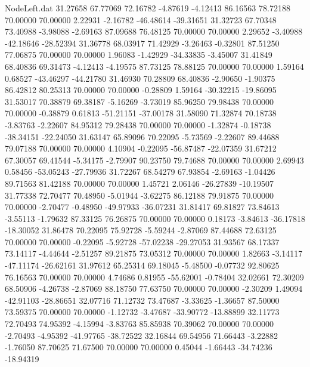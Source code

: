 \begin{filecontents}{NodeLeft.dat}
  31.27658   67.77069   72.16782    -4.87619   -4.12413   86.16563   78.72188   70.00000   70.00000    2.22931   -2.16782  -46.48614  -39.31651
  31.32723   67.70348   73.40988    -3.98088   -2.69163   87.09688   76.48125   70.00000   70.00000    2.29652   -3.40988  -42.18646  -28.52394
  31.36778   68.03917   71.42929    -3.26463   -0.32801   87.51250   77.06875   70.00000   70.00000    1.96083   -1.42929  -34.33835   -3.45007
  31.41849   68.40836   69.31473    -4.12413   -4.19575   87.73125   78.88125   70.00000   70.00000    1.59164    0.68527  -43.46297  -44.21780
  31.46930   70.28809   68.40836    -2.90650   -1.90375   86.42812   80.25313   70.00000   70.00000   -0.28809    1.59164  -30.32215  -19.86095
  31.53017   70.38879   69.38187    -5.16269   -3.73019   85.96250   79.98438   70.00000   70.00000   -0.38879    0.61813  -51.21151  -37.00178
  31.58090   71.32874   70.18738    -3.83763   -2.22607   84.95312   79.28438   70.00000   70.00000   -1.32874   -0.18738  -38.34151  -22.24050
  31.63147   65.89096   70.22095    -5.73569   -2.22607   89.44688   79.07188   70.00000   70.00000    4.10904   -0.22095  -56.87487  -22.07359
  31.67212   67.30057   69.41544    -5.34175   -2.79907   90.23750   79.74688   70.00000   70.00000    2.69943    0.58456  -53.05243  -27.79936
  31.72267   68.54279   67.93854    -2.69163   -1.04426   89.71563   81.42188   70.00000   70.00000    1.45721    2.06146  -26.27839  -10.19507
  31.77338   72.70477   70.48950    -5.01944   -3.62275   86.12188   79.91875   70.00000   70.00000   -2.70477   -0.48950  -49.97933  -36.07231
  31.81417   69.81827   73.84613    -3.55113   -1.79632   87.33125   76.26875   70.00000   70.00000    0.18173   -3.84613  -36.17818  -18.30052
  31.86478   70.22095   75.92728    -5.59244   -2.87069   87.44688   72.63125   70.00000   70.00000   -0.22095   -5.92728  -57.02238  -29.27053
  31.93567   68.17337   73.14117    -4.44644   -2.51257   89.21875   73.05312   70.00000   70.00000    1.82663   -3.14117  -47.11174  -26.62161
  31.97612   65.25314   69.18045    -5.48500   -0.07732   92.80625   76.16563   70.00000   70.00000    4.74686    0.81955  -55.62001   -0.78404
  32.02661   72.30209   68.50906    -4.26738   -2.87069   88.18750   77.63750   70.00000   70.00000   -2.30209    1.49094  -42.91103  -28.86651
  32.07716   71.12732   73.47687    -3.33625   -1.36657   87.50000   73.59375   70.00000   70.00000   -1.12732   -3.47687  -33.90772  -13.88899
  32.11773   72.70493   74.95392    -4.15994   -3.83763   85.85938   70.39062   70.00000   70.00000   -2.70493   -4.95392  -41.97765  -38.72522
  32.16844   69.54956   71.66443    -3.22882   -1.76050   87.70625   71.67500   70.00000   70.00000    0.45044   -1.66443  -34.74236  -18.94319

\end{filecontents}
